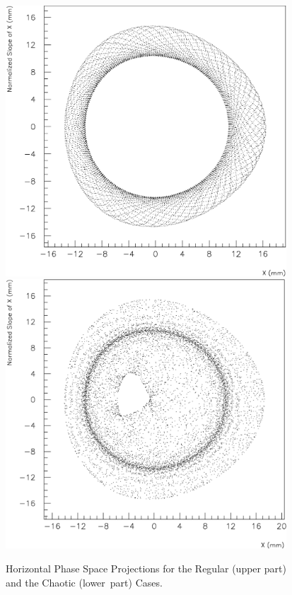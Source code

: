 \documentclass[a4paper,11pt]{report}
\begin{document}
\begin{figure}[H]
\begin{center}
  \mbox{\includegraphics*[width=10.5cm]{exp2}}
  \\[5mm]
  \mbox{\includegraphics*[width=10.5cm]{exp10}}
 \caption{Horizontal Phase Space Projections for the
   Regular (upper part) and the Chaotic \mbox{(lower part)} Cases.}
 \label{H-proj}
\end{center}
\end{figure}
\end{document}
